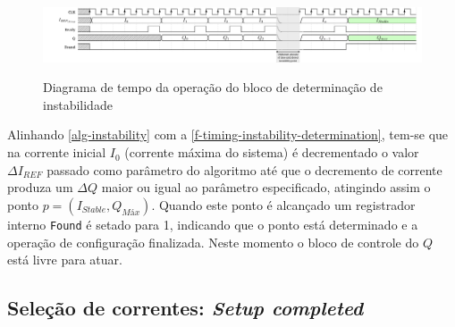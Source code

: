 


\begin{figure}[H]
    \centering
    \caption{Diagrama de tempo da operação do bloco de determinação de instabilidade}
    \includegraphics{fig/timing-instability-determination.pdf}
    \label{f-timing-instability-determination}
\end{figure}

Alinhando \autoref{alg-instability} com a \autoref{f-timing-instability-determination}, tem-se que na corrente inicial $I_0$ (corrente máxima do sistema) é decrementado o valor $\Delta I_{REF}$ passado como parâmetro do algoritmo até que o decremento de corrente produza um $\Delta Q$ maior ou igual ao parâmetro especificado, atingindo assim o ponto $p = (I_{Stable}, Q_{Máx})$. Quando este ponto é alcançado um registrador interno \verb|Found| é setado para 1, indicando que o ponto está determinado e a operação de configuração finalizada. Neste momento o bloco de controle do $Q$ está livre para atuar.








\subsection{Seleção de correntes: \textit{Setup completed}}\label{ss-seleção-correntes}


